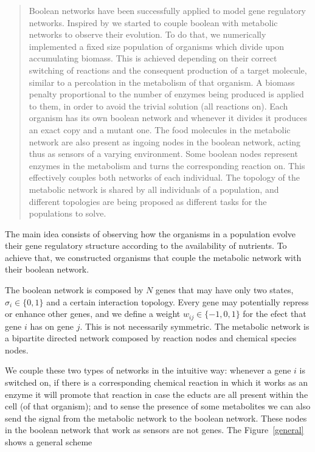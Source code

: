 \documentclass{article}
\begin{document}
\begin{abstract}
 
Boolean networks have been successfully applied to model gene regulatory networks. Inspired by \cite{Goudarzi} we started to couple boolean with metabolic 
networks to observe their evolution. To do that, we numerically implemented a fixed size population of organisms which divide upon accumulating biomass. 
This is achieved depending on their correct switching of reactions and the consequent production of a target molecule, similar to a percolation in the 
metabolism of that organism. A biomass penalty proportional to the number of enzymes being produced is applied to them, in order to avoid the trivial 
solution (all reactions on).  Each organism has its own boolean network and whenever it divides it produces an exact copy and a mutant one. The food 
molecules in the metabolic network are also present as ingoing nodes in the boolean network, acting thus as sensors of a varying environment. 
Some boolean nodes represent enzymes in the metabolism and turns the corresponding reaction on. This effectively couples both networks of each individual. 
The topology of the metabolic network is shared by all individuals of a population, and different topologies are being proposed as different tasks for the 
populations to solve.

\end{abstract}

The main idea consists of observing how the organisms in a population evolve their gene regulatory structure according to the availability of nutrients. 
To achieve that, we constructed organisms that couple the metabolic network with their boolean network. 

The boolean network is composed by $N$ genes that may have only two states, $\sigma_i \in \{0,1\}$ and a certain interaction topology. 
Every gene may potentially repress or enhance other genes, and we define a weight $w_{ij} \in \{-1,0,1\}$ for the efect that gene $i$ has on gene $j$. This is 
not necessarily symmetric. The metabolic network is a bipartite directed network composed by reaction nodes and chemical species nodes. 


We couple these two types of networks in the intuitive way: whenever a gene $i$ is switched on, if there is a corresponding chemical reaction in which it 
works as an enzyme it will promote that reaction in case the educts are all present within the cell (of that organism); and to sense the presence of some 
metabolites we can also send the signal from the metabolic network to the boolean network. These nodes in the boolean network that work as sensors are not 
genes. The Figure~\ref{general} shows a general scheme
\end{document}
